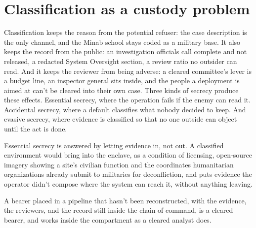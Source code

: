 \section{Classification as a custody problem}
\label{sec:15.5}
Classification keeps the reason from the potential refuser: the case description is the only channel, and the Minab school stays coded as a military base. It also keeps the record from the public: an investigation officials call complete and not released, a redacted System Oversight section, a review ratio no outsider can read. And it keeps the reviewer from being adverse: a cleared committee's lever is a budget line, an inspector general sits inside, and the people a deployment is aimed at can't be cleared into their own case.
Three kinds of secrecy produce these effects. Essential secrecy, where the operation fails if the enemy can read it. Accidental secrecy, where a default classifies what nobody decided to keep. And evasive secrecy, where evidence is classified so that no one outside can object until the act is done.

Essential secrecy is answered by letting evidence in, not out. A classified environment would bring into the enclave, as a condition of licensing, open-source imagery showing a site's civilian function and the coordinates humanitarian organizations already submit to militaries for deconfliction, and puts evidence the operator didn't compose where the system can reach it, without anything leaving.

A bearer placed in a pipeline that hasn't been reconstructed, with the evidence, the reviewers, and the record still inside the chain of command, is a cleared bearer, and works inside the compartment as a cleared analyst does.

